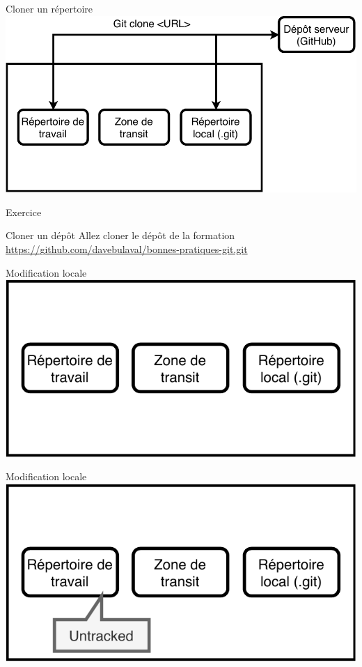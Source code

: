 \documentclass[11pt]{beamer}
\begin{document}
\begin{frame}{Cloner un répertoire}
	\includegraphics[width=0.95\linewidth,height=0.95\textheight,keepaspectratio]{clone.pdf}
\end{frame}

\begin{frame}{Exercice}
	\begin{block}{Cloner un dépôt}
		Allez cloner le dépôt de la formation \url{https://github.com/davebulaval/bonnes-pratiques-git.git}
	\end{block}
\end{frame}

\begin{frame}{Modification locale}
	\includegraphics[width=0.95\linewidth,height=0.95\textheight,keepaspectratio]{stage.pdf}
\end{frame}


\begin{frame}{Modification locale}
	\includegraphics[width=0.95\linewidth,height=0.95\textheight,keepaspectratio]{untracked.pdf}
\end{frame}
\end{document}
